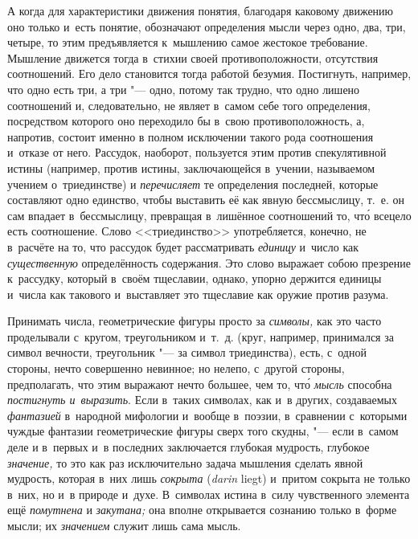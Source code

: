 А когда для характеристики движения понятия, благодаря каковому движению оно
только и~есть понятие, обозначают определения мысли через одно, два, три,
четыре, то этим предъявляется к~мышлению самое жестокое требование. Мышление
движется тогда в~стихии своей противоположности, отсутствия соотношений. Его
дело становится тогда работой безумия. Постигнуть, например, что одно есть три,
а три "--- одно, потому так трудно, что одно лишено соотношений и,
следовательно, не являет в~самом себе того определения, посредством которого
оно переходило бы в~свою противоположность, а, напротив, состоит именно в
полном исключении такого рода соотношения и~отказе от него. Рассудок, наоборот,
пользуется этим против спекулятивной истины (например, против истины,
заключающейся в~учении, называемом учением о~триединстве) и {\em перечисляет}
те определения последней, которые составляют одно единство, чтобы выставить её
как явную бессмыслицу, т.~е. он сам впадает в~бессмыслицу, превращая в~лишённое
соотношений то, чт\'{о} всецело есть соотношение. Слово <<триединство>>
употребляется, конечно, не в~расчёте на то, что рассудок будет рассматривать
{\em единицу} и~число как {\em существенную} определённость содержания. Это слово
выражает собою презрение к~рассудку, который в~своём тщеславии, однако, упорно
держится единицы и~числа как такового и~выставляет это тщеславие как оружие
против разума.

Принимать числа, геометрические фигуры просто за {\em символы,} как это часто
проделывали с~кругом, треугольником и~т.~д. (круг, например, принимался за
символ вечности, треугольник "--- за символ триединства), есть, с~одной
стороны, нечто совершенно невинное; но нелепо, с~другой стороны, предполагать,
что этим выражают нечто большее, чем то, чт\'{о} {\em мысль} способна
{\em постигнуть и~выразить}. Если в~таких символах, как и~в других, создаваемых
{\em фантазией} в~народной мифологии и~вообще в~поэзии, в~сравнении с~которыми
чуждые фантазии геометрические фигуры сверх того скудны, "--- если в~самом деле
и в~первых и~в последних заключается глубокая мудрость, глубокое
{\em значение,} то это как раз исключительно задача мышления сделать явной мудрость,
которая в~них лишь {\em сокрыта} ({\em \!darin} liegt) и~притом сокрыта не только
в~них, но и~в природе и~духе. В~символах истина в~силу чувственного элемента
ещё {\em помутнена} и {\em закутана;} она вполне открывается сознанию только
в~форме мысли; их {\em значением} служит лишь сама мысль.

